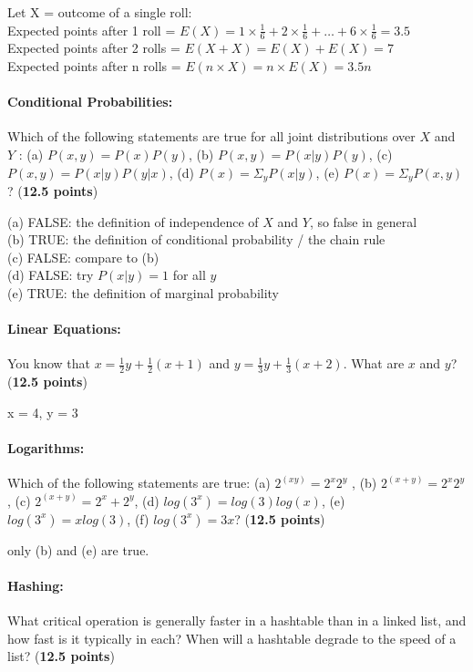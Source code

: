 \documentclass[12pt,twoside]{article}
\begin{document}
{\color{red}

Let X = outcome of a single roll:\\
Expected points after 1 roll = $E({X})=1\times \frac{1}{6} + 2 \times \frac{1}{6} + \dots + 6 \times \frac{1}{6} = 3.5$ \\
Expected points after 2 rolls = $E({X+X})= E(X) + E(X) = 7$ \\
Expected points after n rolls = $E({n\times X})= n \times E(X) = 3.5 n $ \\

}


\paragraph{Conditional Probabilities:} Which of the following statements are true for all joint distributions over $X$ and $Y$ : (a) $P(x, y) = P(x)P(y)$, (b) $P(x, y) = P(x|y)P(y)$, (c) $P(x, y) = P(x|y)P(y|x)$, (d) $P(x) = \Sigma_y P(x|y)$, (e) $P(x) = \Sigma_y P(x, y)$? (\textbf{12.5 points})

{\color{red}

(a) FALSE: the definition of independence of $X$ and $Y$, so false in general \\
(b) TRUE: the definition of conditional probability / the chain rule \\
(c) FALSE: compare to (b) \\
(d) FALSE: try $P(x|y) = 1$ for all $y$ \\
(e) TRUE: the definition of marginal probability
}

\paragraph{Linear Equations:} You know that $x=\frac{1}{2}y+\frac{1}{2}(x+1)$ and $y=\frac{1}{3}y+\frac{1}{3}(x+2)$. What are $x$ and $y$? (\textbf{12.5 points})


{\color{red}
x = 4, y = 3
}

\paragraph{Logarithms:} Which of the following statements are true: (a) $2^{(xy)} = 2^x2^y$
, (b) $2^{(x+y)} = 2^x2^y$, (c) $2^{(x+y)} = 2^x + 2^y$, (d) $log(3^x) = log(3)log(x)$, (e) $log(3^x
) = x log(3)$, (f) $log(3^x) = 3x$? (\textbf{12.5 points})

{\color{red}
	only (b) and (e) are true.
}

\paragraph{Hashing:} What critical operation is generally faster in a hashtable than in a linked list, and how fast is it typically in each? When will a hashtable degrade to the speed of a list? (\textbf{12.5 points})
\end{document}
